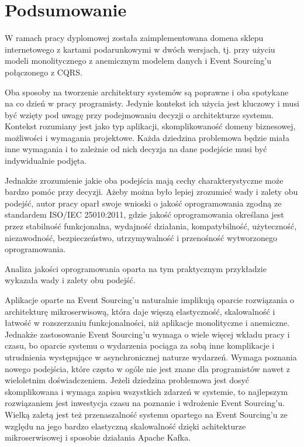 \chapter{Podsumowanie}


W ramach pracy dyplomowej została zaimplementowana domena sklepu internetowego z kartami podarunkowymi w dwóch wersjach, tj. przy użyciu modeli monolitycznego z anemicznym modelem danych i Event Sourcing'u połączonego z CQRS. 

Oba sposoby na tworzenie architektury systemów są poprawne i oba spotykane na co dzień w pracy programisty. Jedynie kontekst ich użycia jest kluczowy i musi być wzięty pod uwagę przy podejmowaniu decyzji o architekturze systemu. Kontekst rozumiany jest jako typ aplikacji, skomplikowaność domeny biznesowej, możliwości i wymagania projektowe. Każda dziedzina problemowa będzie miała inne wymagania i to zależnie od nich decyzja na dane podejście musi być indywidualnie podjęta.
 
Jednakże zrozumienie jakie oba podejścia mają cechy charakterystyczne może bardzo pomóc przy decyzji. Ażeby można było lepiej zrozumieć wady i zalety obu podejść, autor pracy oparł swoje wnioski o jakość oprogramowania zgodną ze standardem ISO/IEC 25010:2011, gdzie jakość oprogramowania określana jest przez stabilność funkcjonalna, wydajność działania, kompatybilność, użyteczność, niezawodność, bezpieczeństwo, utrzymywalność i przenośność wytworzonego oprogramowania.\cite{jakoscOpr}
 
Analiza jakości oprogramowania oparta na tym praktycznym przykładzie wykazała wady i zalety obu podejść.

Aplikacje oparte na Event Sourcing'u naturalnie implikują oparcie rozwiązania o architekturę mikroserwisową, która daje więszą elastyczność, skalowalność i łatwość w rozszerzaniu funkcjonalności, niż aplikacje monolityczne i anemiczne.
Jednakże zastosowanie Event Sourcing'u wymaga o wiele więcej wkładu pracy i czasu, bo oparcie systemu o wydarzenia pociąga za sobą inne komplikacje i utrudnienia występujące w asynchronicznej naturze wydarzeń. Wymaga poznania nowego podejścia, które często w ogóle nie jest znane dla programistów nawet z wieloletnim doświadczeniem. Jeżeli dziedzina problemowa jest dosyć skomplikowana i wymaga zapisu wszystkich zdarzeń w systemie, to najlepszym rozwiązaniem jest inwestycja czasu na poznanie i wdrożenie Event Sourcing'u. Wielką zaletą jest też przenaszalność systemu opartego na Event Sourcing'u ze względu na jego bardzo elastyczną skalowalność dzięki achitekturze mikroserwisowej i sposobie działania Apache Kafka.

